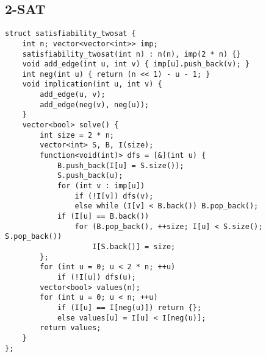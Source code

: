 \documentclass[landscape, 8pt, a4paper, oneside]{extarticle}
\begin{document}
\begin{multicols}{3}
\subsection{2-SAT}
\begin{verbatim}
struct satisfiability_twosat {
    int n; vector<vector<int>> imp;
    satisfiability_twosat(int n) : n(n), imp(2 * n) {}
    void add_edge(int u, int v) { imp[u].push_back(v); }
    int neg(int u) { return (n << 1) - u - 1; }
    void implication(int u, int v) {
        add_edge(u, v);
        add_edge(neg(v), neg(u));
    }
    vector<bool> solve() {
        int size = 2 * n;
        vector<int> S, B, I(size);
        function<void(int)> dfs = [&](int u) {
            B.push_back(I[u] = S.size());
            S.push_back(u);
            for (int v : imp[u])
                if (!I[v]) dfs(v);
                else while (I[v] < B.back()) B.pop_back();
            if (I[u] == B.back())
                for (B.pop_back(), ++size; I[u] < S.size(); S.pop_back())
                    I[S.back()] = size;
        };
        for (int u = 0; u < 2 * n; ++u)
            if (!I[u]) dfs(u);
        vector<bool> values(n);
        for (int u = 0; u < n; ++u)
            if (I[u] == I[neg(u)]) return {};
            else values[u] = I[u] < I[neg(u)];
        return values;
    }
};
\end{verbatim}

\end{multicols}
\end{document}
